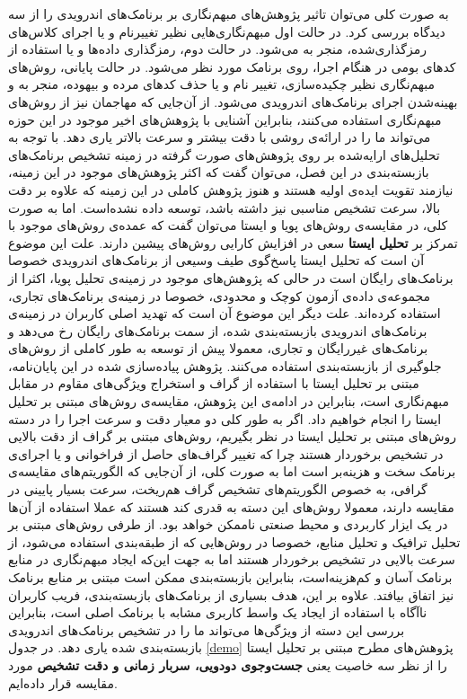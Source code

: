 به صورت کلی می‌توان تاثیر پژوهش‌های مبهم‌نگاری بر برنامک‌های اندرویدی را از سه دید‌گاه بررسی کرد. در حالت اول مبهم‌نگاری‌هایی نظیر تغییرنام و یا اجرای کلاس‌های رمز‌گذاری‌شده، منجر به  می‌شود. در حالت دوم، رمز‌گذاری داده‌ها و یا استفاده از کد‌های بومی در هنگام اجرا،  روی برنامک مورد نظر می‌شود. در حالت پایانی، روش‌های مبهم‌نگاری نظیر چکیده‌سازی، تغییر نام و یا حذف کد‌های مرده و بیهوده، منجر به  و بهینه‌شدن اجرای برنامک‌های اندرویدی می‌شود. از آن‌جایی که مهاجمان نیز از روش‌های مبهم‌نگاری استفاده می‌کنند، بنابراین آشنایی با پژوهش‌های اخیر موجود در این حوزه می‌تواند ما را در ارائه‌ی روشی با دقت بیشتر و سرعت بالاتر یاری دهد.
با توجه به تحلیل‌های ارایه‌شده بر روی پژوهش‌های صورت گرفته در زمینه تشخیص برنامک‌های بازبسته‌بندی در این فصل، می‌توان گفت که اکثر پژوهش‌های موجود در این زمینه، نیازمند تقویت ایده‌ی اولیه هستند و هنوز پژوهش کاملی در این زمینه که علاوه بر دقت بالا، سرعت تشخیص مناسبی نیز داشته باشد، توسعه داده نشده‌است. اما به صورت کلی، در مقایسه‌ی روش‌های پویا و ایستا می‌توان گفت که عمده‌ی روش‌های موجود با تمرکز بر \textbf{تحلیل ایستا }سعی در افزایش کارایی روش‌های پیشین دارند. علت این موضوع آن است که تحلیل ایستا پاسخ‌گوی طیف وسیعی از برنامک‌های اندرویدی خصوصا برنامک‌های رایگان است در حالی که پژوهش‌های موجود در زمینه‌ی تحلیل پویا، اکثرا از مجموعه‌ی داده‌ی آزمون کوچک و محدودی، خصوصا در زمینه‌ی برنامک‌های تجاری، استفاده کرده‌اند. علت دیگر این موضوع آن است که تهدید اصلی کاربران در زمینه‌ی برنامک‌های اندرویدی بازبسته‌بندی شده، از سمت برنامک‌های رایگان رخ می‌دهد و برنامک‌های غیررایگان و تجاری، معمولا پیش از توسعه به طور کاملی از روش‌های جلوگیری از بازبسته‌بندی استفاده می‌کنند. پژوهش پیاده‌سازی شده در این پایان‌نامه، مبتنی بر تحلیل ایستا با استفاده از گراف و استخراج ویژگی‌های مقاوم در مقابل مبهم‌نگاری است، بنابراین در ادامه‌ی این پژوهش، مقایسه‌ی روش‌های مبتنی بر تحلیل ایستا را انجام خواهیم داد. اگر به طور کلی دو معیار دقت و سرعت اجرا را در دسته‌ روش‌های مبتنی بر تحلیل ایستا در نظر بگیریم، روش‌های مبتنی بر گراف از دقت بالایی در تشخیص برخوردار هستند چرا که تغییر گراف‌های حاصل از فراخوانی و یا اجرای‌ی برنامک سخت و هزینه‌بر است اما به صورت کلی، از آن‌جایی که الگوریتم‌های مقایسه‌ی گرافی، به خصوص الگوریتم‌های تشخیص گراف هم‌ریخت، سرعت بسیار پایینی در  مقایسه دارند، معمولا روش‌های این دسته به قدری کند هستند که عملا استفاده از آن‌ها در یک ایزار کاربردی و محیط صنعتی ناممکن خواهد بود. از طرفی روش‌های مبتنی بر تحلیل ترافیک و تحلیل منابع، خصوصا در روش‌هایی که از طبقه‌بندی استفاده می‌شود، از سرعت بالایی در تشخیص برخوردار هستند اما به جهت این‌که ایجاد مبهم‌نگاری در منابع برنامک آسان و کم‌هزینه‌است، بنابراین بازبسته‌بندی ممکن است مبتنی بر منابع برنامک نیز اتفاق بیافتد. علاوه بر این، هدف بسیاری از برنامک‌های بازبسته‌بندی، فریب کاربران ناآگاه با استفاده از ایجاد یک واسط کاربری مشابه با برنامک اصلی است، بنابراین بررسی این دسته از ویژگی‌ها می‌تواند ما را در تشخیص برنامک‌های اندرویدی بازبسته‌بندی شده یاری دهد. در جدول \ref{demo} پژوهش‌های مطرح مبتنی بر تحلیل ایستا را از نظر سه خاصیت یعنی \textbf{جست‌وجوی دودویی، سربار زمانی و دقت تشخیص} مورد مقایسه قرار داده‌ایم.
\\

